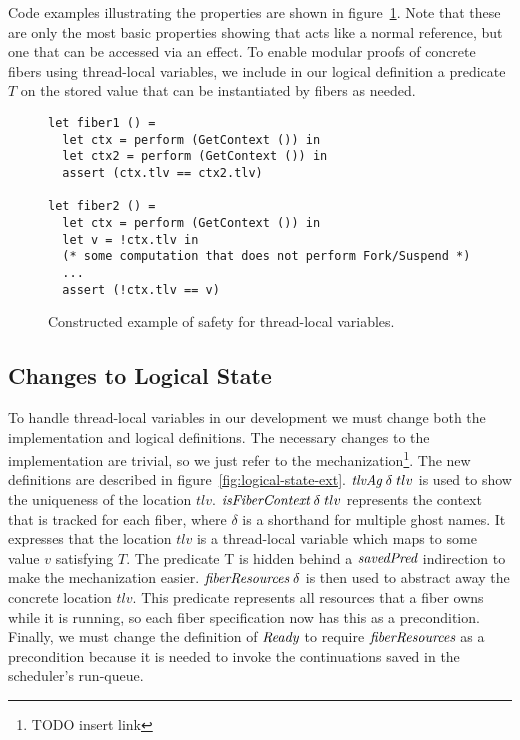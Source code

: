 Code examples illustrating the properties are shown in figure~\ref{fig:tlv-example}.
Note that these are only the most basic properties showing that  acts like a normal reference, but one that can be accessed via an effect.
To enable modular proofs of concrete fibers using thread-local variables, we include in our logical definition a predicate \(T\) on the stored value that can be instantiated by fibers as needed.

\begin{figure}
  \begin{verbatim}
let fiber1 () =
  let ctx = perform (GetContext ()) in
  let ctx2 = perform (GetContext ()) in
  assert (ctx.tlv == ctx2.tlv)

let fiber2 () =
  let ctx = perform (GetContext ()) in
  let v = !ctx.tlv in
  (* some computation that does not perform Fork/Suspend *)
  ...
  assert (!ctx.tlv == v)
  \end{verbatim}
  \caption{Constructed example of safety for thread-local variables.}
  \label{fig:tlv-example}
\end{figure}

\subsection{Changes to Logical State}

To handle thread-local variables in our development we must change both the implementation and logical definitions.
The necessary changes to the implementation are trivial, so we just refer to the mechanization\footnote{TODO insert link}.
The new definitions are described in figure~\ref{fig:logical-state-ext}.
\(\emph{tlvAg}{}\; \delta\; tlv\) is used to show the uniqueness of the location \(tlv\).
\(\emph{isFiberContext}{}\; \delta\; tlv\) represents the context that is tracked for each fiber, where \(\delta\) is a shorthand for multiple ghost names.
It expresses that the location \(tlv\) is a thread-local variable which maps to some value \(v\) satisfying \(T\).
The predicate T is hidden behind a \(\emph{savedPred}{}\) indirection to make the mechanization easier.
\(\emph{fiberResources}{}\; \delta\) is then used to abstract away the concrete location \(tlv\).
This predicate represents all resources that a fiber owns while it is running, so each fiber specification now has this as a precondition.
Finally, we must change the definition of \(\emph{Ready}{}\) to require \(\emph{fiberResources}{}\) as a precondition because it is needed to invoke the continuations saved in the scheduler's run-queue.

